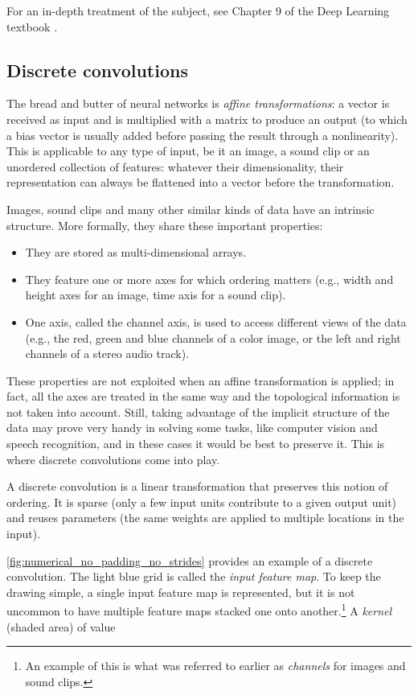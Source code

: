 For an in-depth treatment of the subject, see Chapter 9 of the Deep Learning
textbook \citep{Goodfellow-et-al-2016-Book}.

\subsection{Discrete convolutions}

The bread and butter of neural networks is \emph{affine transformations}: a
vector is received as input and is multiplied with a matrix to produce an
output (to which a bias vector is usually added before passing the result
through a nonlinearity). This is applicable to any type of input, be it an
image, a sound clip or an unordered collection of features: whatever their
dimensionality, their representation can always be flattened into a vector
before the transformation.

Images, sound clips and many other similar kinds of data have an intrinsic
structure. More formally, they share these important properties:

\begin{itemize}
    \item They are stored as multi-dimensional arrays.
    \item They feature one or more axes for which ordering matters (e.g., width
        and height axes for an image, time axis for a sound clip).
    \item One axis, called the channel axis, is used to access different views
        of the data (e.g., the red, green and blue channels of a color image, or
        the left and right channels of a stereo audio track).
\end{itemize}

These properties are not exploited when an affine transformation is applied; in
fact, all the axes are treated in the same way and the topological information
is not taken into account. Still, taking advantage of the implicit structure of
the data may prove very handy in solving some tasks, like computer vision and
speech recognition, and in these cases it would be best to preserve it. This is
where discrete convolutions come into play.

A discrete convolution is a linear transformation that preserves this notion of
ordering. It is sparse (only a few input units contribute to a given output
unit) and reuses parameters (the same weights are applied to multiple locations
in the input).

\autoref{fig:numerical_no_padding_no_strides} provides an example of a discrete
convolution. The light blue grid is called the {\em input feature map}. To keep
the drawing simple, a single input feature map is represented, but it is not
uncommon to have multiple feature maps stacked one onto another.\footnote{%
    An example of this is what was referred to earlier as {\em channels\/} for
    images and sound clips.}
A {\em kernel\/} (shaded area) of value

